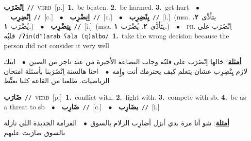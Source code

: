 \documentclass[10pt,a4paper,twoside]{article} %
\begin{document}
\begin{multicols}{2}
{\setlength\topsep{0pt}\textbf{\foreignlanguage{arabic}{اِنْضَرَب}}\ {\color{gray}\texttt{//}\color{black}}\ \textsc{verb}\ [p.]\ \textbf{1.}~be beaten.  \textbf{2.}~be harmed.  \textbf{3.}~get hurt\ \ $\bullet$\ \ \setlength\topsep{0pt}\textbf{\foreignlanguage{arabic}{اِنْضِرِب}}\ {\color{gray}\texttt{//}\color{black}}\ [c.]\ \ $\bullet$\ \ \setlength\topsep{0pt}\textbf{\foreignlanguage{arabic}{اِنِضْرِب}}\ {\color{gray}\texttt{//}\color{black}}\ [c.]\ \ $\bullet$\ \ \setlength\topsep{0pt}\textbf{\foreignlanguage{arabic}{يِنْضِرِب}}\ {\color{gray}\texttt{//}\color{black}}\ [i.]\ \color{gray}(msa. \foreignlanguage{arabic}{يتأذَّى}~\foreignlanguage{arabic}{\textbf{٢.}}  \foreignlanguage{arabic}{يُضْرَب}~\foreignlanguage{arabic}{\textbf{١.}})\color{black}\ \ $\bullet$\ \ \setlength\topsep{0pt}\textbf{\foreignlanguage{arabic}{يِنِضْرِب}}\ {\color{gray}\texttt{//}\color{black}}\ [i.]\ \color{gray}(msa. \foreignlanguage{arabic}{يتأذَّى}~\foreignlanguage{arabic}{\textbf{٢.}}  \foreignlanguage{arabic}{يُضْرَب}~\foreignlanguage{arabic}{\textbf{١.}})\color{black}\ \ $\bullet$\ \ \textsc{ph.} \color{gray} \foreignlanguage{arabic}{اِنْضَرَب على قلبُه}\color{black}\ {\color{gray}\texttt{/{\sffamily ʔin(dˤ)arab ʕala (q)albo}/}\color{black}}\ \textbf{1.}~take the wrong decision because the person did not consider it very well\  \begin{flushright}\color{gray}\foreignlanguage{arabic}{\textbf{\underline{\foreignlanguage{arabic}{أمثلة}}}: خالها اِنْضَرَب على قلبُه وجاب البضاعة الأخيرة من عند تاجر من الصين\ $\bullet$\ \  ابنك لازم يِنْضِرِب عشان يتعلم كيف يحترمك أنت وإِمه\ $\bullet$\ \  احنا هالسنة اِنْضَرَبنا بأسئلة امتحان الرياضيات. طلعنا من القاعة كلنا نعيِّط}\end{flushright}\color{black}} \vspace{2mm}

{\setlength\topsep{0pt}\textbf{\foreignlanguage{arabic}{ضَارَب}}\ {\color{gray}\texttt{//}\color{black}}\ \textsc{verb}\ [p.]\ \textbf{1.}~conflict with.  \textbf{2.}~fight with.  \textbf{3.}~compete with sb.  \textbf{4.}~be as a threat to sb\ \ $\bullet$\ \ \setlength\topsep{0pt}\textbf{\foreignlanguage{arabic}{ضَارِب}}\ {\color{gray}\texttt{//}\color{black}}\ [c.]\ \ $\bullet$\ \ \setlength\topsep{0pt}\textbf{\foreignlanguage{arabic}{يضَارِب}}\ {\color{gray}\texttt{//}\color{black}}\ [i.]\  \begin{flushright}\color{gray}\foreignlanguage{arabic}{\textbf{\underline{\foreignlanguage{arabic}{أمثلة}}}: شو أنا مرة بدي أنزل أضارِب الزلام بالسوق\ $\bullet$\ \  الفرامة الجديدة اللي نازلة بالسوق ضارَبت عليهم}\end{flushright}\color{black}} \vspace{2mm}


\end{multicols}
\end{document}
